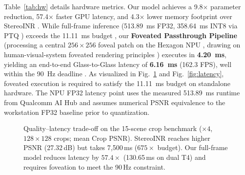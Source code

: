 \documentclass[conference]{IEEEtran}
\begin{document}
Table~\ref{tab:hw} details hardware metrics. Our model achieves a 9.8$\times$ parameter reduction, 57.4$\times$ faster GPU latency, and 4.3$\times$ lower memory footprint over StereoINR \cite{stereoinr}. While full-frame inference (513.89~ms FP32, 358.64~ms INT8 via PTQ \cite{ptq}) exceeds the 11.11~ms budget \cite{vst_latency, motion_to_photon}, our \textbf{Foveated Passthrough Pipeline} (processing a central $256 \times 256$ foveal patch on the Hexagon NPU \cite{qnn_sdk}, drawing on human-visual-system foveated rendering principles \cite{foveated_rendering, patney_foveated}) executes in \textbf{4.20~ms}, yielding an end-to-end Glass-to-Glass latency of \textbf{6.16~ms} (162.3 FPS), well within the 90~Hz deadline \cite{motion_to_photon}. As visualized in Fig.~\ref{fig:pareto} and Fig.~\ref{fig:latency}, foveated execution is required to satisfy the 11.11~ms budget on standalone hardware. The NPU FP32 latency point uses the measured 513.89~ms runtime from Qualcomm AI Hub and assumes numerical PSNR equivalence to the workstation FP32 baseline prior to quantization.

\begin{figure}[!t]
\centering
{}
\caption{Quality--latency trade-off on the 15-scene crop benchmark ($\times 4$, $128\times128$ crops; mean Crop PSNR). StereoINR reaches higher PSNR (27.32\,dB) but takes 7{,}500\,ms ($675\times$ budget). Our full-frame model reduces latency by $57.4\times$ (130.65\,ms on dual T4) and requires foveation to meet the 90\,Hz constraint.}
\label{fig:pareto}
\end{figure}
\end{document}
